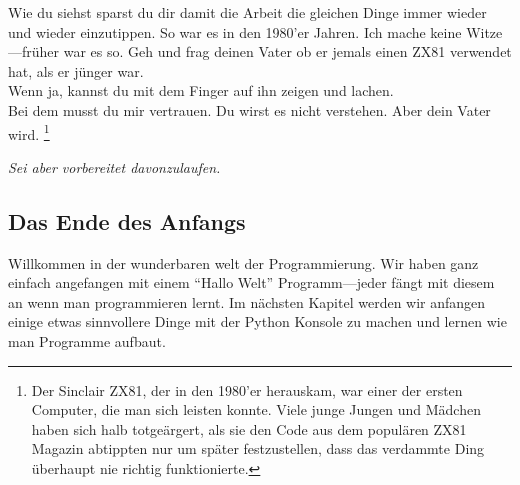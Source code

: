 Wie du siehst sparst du dir damit die Arbeit die gleichen Dinge immer wieder und wieder einzutippen. So war es in den 1980'er Jahren. Ich mache keine Witze---früher war es so. Geh und frag deinen Vater ob er jemals einen ZX81 verwendet hat, als er jünger war.\\

\noindent
Wenn ja, kannst du mit dem Finger auf ihn zeigen und lachen.\\

\noindent
Bei dem musst du mir vertrauen. Du wirst es nicht verstehen. Aber dein Vater wird. \footnote{Der Sinclair ZX81, der in den 1980'er herauskam, war einer der ersten Computer, die man sich leisten konnte. Viele junge Jungen und Mädchen haben sich halb totgeärgert, als sie den Code aus dem populären ZX81 Magazin abtippten nur um später festzustellen, dass das verdammte Ding überhaupt nie richtig funktionierte.}


\noindent
\emph{Sei aber vorbereitet davonzulaufen.}

\subsection*{\color{BrickRed}Das Ende des Anfangs}

Willkommen in der wunderbaren welt der Programmierung. Wir haben ganz einfach angefangen mit einem ``Hallo Welt'' Programm---jeder fängt mit diesem an wenn man programmieren lernt.
Im nächsten Kapitel werden wir anfangen einige etwas sinnvollere Dinge mit der Python Konsole zu machen und lernen wie man Programme aufbaut.

\newpage
